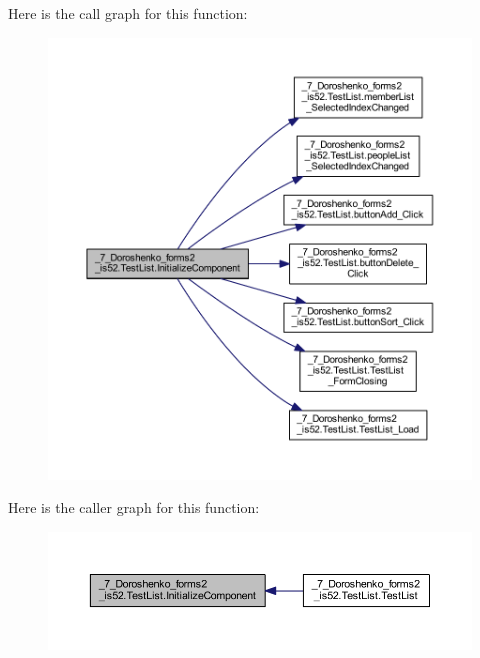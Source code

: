 Here is the call graph for this function\+:
\nopagebreak
\begin{figure}[H]
\begin{center}
\leavevmode
\includegraphics[width=350pt]{class__7___doroshenko__forms2__is52_1_1_test_list_acd9cb03990000f83a3e86ceac040ff7f_cgraph}
\end{center}
\end{figure}
Here is the caller graph for this function\+:
\nopagebreak
\begin{figure}[H]
\begin{center}
\leavevmode
\includegraphics[width=350pt]{class__7___doroshenko__forms2__is52_1_1_test_list_acd9cb03990000f83a3e86ceac040ff7f_icgraph}
\end{center}
\end{figure}
\hypertarget{class__7___doroshenko__forms2__is52_1_1_test_list_afa5f16b3df276bde3cefe54969bf5bed}{}\label{class__7___doroshenko__forms2__is52_1_1_test_list_afa5f16b3df276bde3cefe54969bf5bed} 
